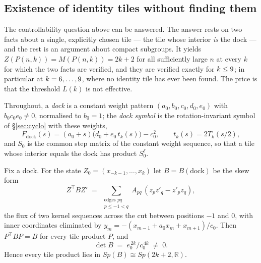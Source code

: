 \subsection*{Existence of identity tiles without finding them}
\label{sec:tilesallk}

The controllability question above can be answered. The answer rests on two
facts about a single, explicitly chosen tile --- the tile whose interior
\emph{is} the dock --- and the rest is an argument about compact subgroups.
It yields $Z(P(n,k))=M(P(n,k))=2k+2$ for all sufficiently large $n$ at every
$k$ for which the two facts are verified, and they are verified exactly for
$k\le9$; in particular at $k=6,\dots,9$, where no identity tile has
ever been found. The price is that the threshold $L(k)$ is not effective.

Throughout, a \emph{dock} is a constant weight pattern $(a_0,b_0,c_0,d_0,e_0)$
with $b_0c_0e_0\ne0$, normalised to $b_0=1$; the \emph{dock symbol} is the
rotation-invariant symbol of \S\ref{sec:cyclo} with these weights,
\[
  F_{\mathrm{dock}}(s)=(a_0+s)\bigl(d_0+e_0\,t_k(s)\bigr)-c_0^{2},
  \qquad t_k(s)=2T_k(s/2),
\]
and $S_0$ is the common step matrix of the constant weight sequence, so that a
tile whose interior equals the dock has product $S_0^{\ell}$.

\begin{lemma}\label{lem:wronskian}
Fix a dock. For the state $Z_0=(x_{-k-1},\dots,x_k)$ let $B=B(\mathrm{dock})$ be
the skew form
\[
  Z^{\!\top}BZ' \;=\; \sum_{\substack{\text{edges }pq\\ p\le -1<q}} A_{pq}\,(z_pz'_q-z'_pz_q),
\]
the flux of two kernel sequences across the cut between positions $-1$ and $0$,
with inner coordinates eliminated by $y_m=-(x_{m-1}+a_0x_m+x_{m+1})/c_0$. Then
$P^{\!\top}BP=B$ for every tile product $P$, and
\[
  \det B \;=\; e_0^{\,2k}/c_0^{\,4k}\;\ne\;0 .
\]
Hence every tile product lies in $Sp(B)\cong Sp(2k+2,\mathbb R)$.
\end{lemma}

